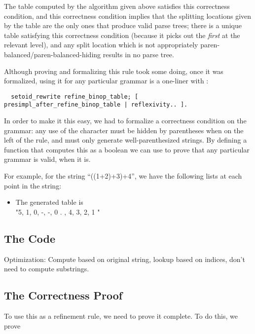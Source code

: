     The table computed by the algorithm given above satisfies this correctness condition, and this correctness condition implies that the splitting locations given by the table are the only ones that produce valid parse trees; there is a unique table satisfying this correctness condition (because it picks out the \emph{first} \terminal{+} at the relevant level), and any split location which is not appropriately paren-balanced/paren-balanced-hiding results in no parse tree.  
    
    Although proving and formalizing this rule took some doing, once it was formalized, using it for any particular grammar is a one-liner with :
\begin{verbatim}
  setoid_rewrite refine_binop_table; [ presimpl_after_refine_binop_table | reflexivity.. ].
\end{verbatim}
    
    In order to make it this easy, we had to formalize a correctness condition on the grammar: any use of the \terminal{+} character must be hidden by parentheses when on the left of the  rule, and  must only generate well-parenthesized strings.  By defining a function that computes this as a boolean we can use  to prove that any particular grammar is valid, when it is.
    
    
    
    
    For example, for the string ``((1+2)+3)+4'', we have the following lists at each point in the string:
      \begin{itemize} \item  The generated table is  \\
          "5, 1, 0, -, -, 0 .
            , 4, 3, 2, 1
          "
    \end{itemize}
    
  \subsection{The Code}
 
    Optimization: Compute based on original string, lookup based on indices, don't need to compute substrings.
  \subsection{The Correctness Proof}
    To use this as a refinement rule, we need to prove it complete.  To do this, we prove 

